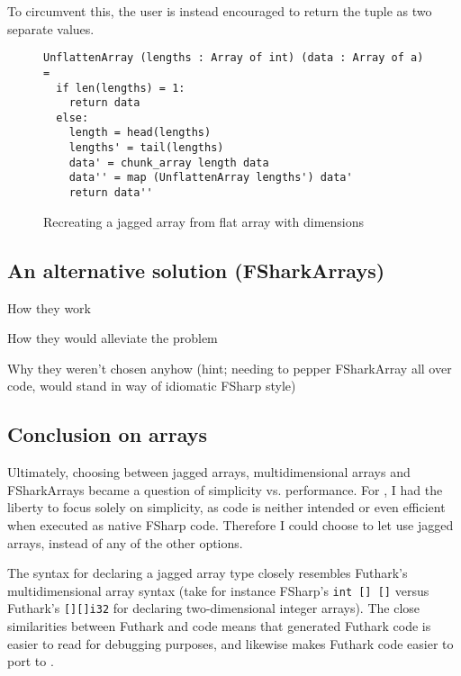 To circumvent this, the user is instead encouraged to return the tuple as two
separate values.

\begin{figure}[h]
  \centering
\begin{verbatim}
UnflattenArray (lengths : Array of int) (data : Array of a) =
  if len(lengths) = 1:
    return data
  else:
    length = head(lengths)
    lengths' = tail(lengths)
    data' = chunk_array length data 
    data'' = map (UnflattenArray lengths') data'
    return data''
\end{verbatim}
  \caption{Recreating a jagged array from flat array with dimensions}
  \label{fig:unflattenarray}
\end{figure}

\subsection*{An alternative solution (FSharkArrays)}
How they work

How they would alleviate the problem

Why they weren't chosen anyhow (hint; needing to pepper FSharkArray all over
code, would stand in way of idiomatic FSharp style)

\subsection*{Conclusion on arrays}
Ultimately, choosing between jagged arrays, multidimensional arrays and
FSharkArrays became a question of simplicity vs. performance.
For \fshark{}, I had the liberty to focus solely on simplicity, as \fshark{}
code is neither intended or even efficient when executed as native FSharp code.
Therefore I could choose to let \fshark{} use jagged arrays, instead of any of
the other options.

The syntax for declaring a jagged array type closely
resembles Futhark's multidimensional array syntax (take for instance FSharp's
\texttt{int [] []} versus Futhark's \texttt{[][]i32} for declaring
two-dimensional integer arrays).
The close similarities between Futhark and \fshark{} code means that \fshark{}
generated Futhark code is easier to read for debugging purposes, and likewise
makes Futhark code easier to port to \fshark{}.

